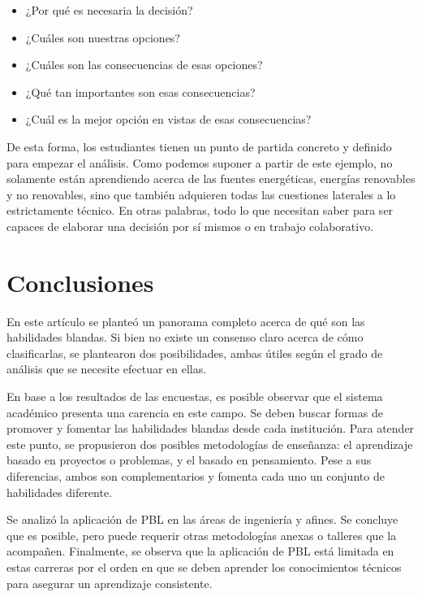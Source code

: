 \documentclass[conference]{IEEEtran}
\begin{document}
\begin{itemize}
    \item ¿Por qué es necesaria la decisión?
    \item ¿Cuáles son nuestras opciones?
    \item ¿Cuáles son las consecuencias de esas opciones?
    \item ¿Qué tan importantes son esas consecuencias?
    \item ¿Cuál es la mejor opción en vistas de esas consecuencias?
\end{itemize}

De esta forma, los estudiantes tienen un punto de partida concreto y definido para empezar el análisis. Como podemos suponer a partir de este ejemplo, no solamente están aprendiendo acerca de las fuentes energéticas, energías renovables y no renovables, sino que también adquieren todas las cuestiones laterales a lo estrictamente técnico. En otras palabras, todo lo que necesitan saber para ser capaces de elaborar una decisión por sí mismos o en trabajo colaborativo.

\section{Conclusiones}
\label{scrivauto:18}

En este artículo se planteó un panorama completo acerca de qué son las habilidades blandas. Si bien no existe un consenso claro acerca de cómo clasificarlas, se plantearon dos posibilidades, ambas útiles según el grado de análisis que se necesite efectuar en ellas.

En base a los resultados de las encuestas, es posible observar que el sistema académico presenta una carencia en este campo. Se deben buscar formas de promover y fomentar las habilidades blandas desde cada institución. Para atender este punto, se propusieron dos posibles metodologías de enseñanza: el aprendizaje basado en proyectos o problemas, y el basado en pensamiento. Pese a sus diferencias, ambos son complementarios y fomenta cada uno un conjunto de habilidades diferente.

Se analizó la aplicación de PBL en las áreas de ingeniería y afines. Se concluye que es posible, pero puede requerir otras metodologías anexas o talleres que la acompañen. Finalmente, se observa que la aplicación de PBL está limitada en estas carreras por el orden en que se deben aprender los conocimientos técnicos para asegurar un aprendizaje consistente.
\end{document}
